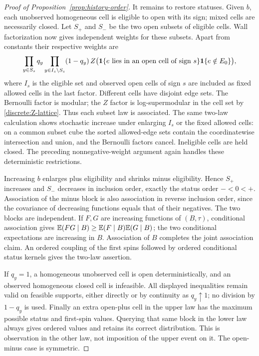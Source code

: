 \begin{proof}[Proof of Proposition~\ref{prop:history-order}]
It remains to restore statuses. Given $b$, each unobserved homogeneous
cell is eligible to open with its sign; mixed cells are necessarily closed.
Let $S_+$ and $S_-$ be the two open subsets of eligible cells. Wall
factorization now gives independent weights for these subsets. Apart from
constants their respective weights are
\begin{equation}\label{discrete:subset-weight}
 \prod_{y\in S_s}q_y
 \prod_{y\in I_s\setminus S_s}(1-q_y)\,
 Z\bigl(\mathbf 1\{e\text{ lies in an open cell of sign }s\}
                    \mathbf 1\{e\notin E_0\}\bigr),
\end{equation}
where $I_s$ is the eligible set and observed open cells of sign $s$ are
included as fixed allowed cells in the last factor. Different cells have
disjoint edge sets. The Bernoulli factor is modular; the $Z$ factor is
log-supermodular in the cell set by \eqref{discrete:Z-lattice}. Thus each
subset law is associated. The same two-law calculation shows stochastic
increase under enlarging $I_s$ or the fixed allowed cells: on a common
subset cube the sorted allowed-edge sets contain the coordinatewise
intersection and union, and the Bernoulli factors cancel. Ineligible cells
are held closed. The preceding nonnegative-weight argument again handles
these deterministic restrictions.

Increasing $b$ enlarges plus eligibility and shrinks minus eligibility.
Hence $S_+$ increases and $S_-$ decreases in inclusion order, exactly the
status order $-<0<+$. Association of the minus block is also association
in reverse inclusion order, since the covariance of decreasing functions
equals that of their negatives. The two blocks are independent. If $F,G$
are increasing functions of $(B,\tau)$, conditional association gives
$\mathbb E(FG\mid B)\ge\mathbb E(F\mid B)\mathbb E(G\mid B)$; the two conditional
expectations are increasing in $B$. Association of $B$ completes the
joint association claim. An ordered coupling of the first spins followed
by ordered conditional status kernels gives the two-law assertion.

If $q_y=1$, a homogeneous unobserved cell is open deterministically, and
an observed homogeneous closed cell is infeasible. All displayed
inequalities remain valid on feasible supports, either directly or by
continuity as $q_y\uparrow1$; no division by $1-q_y$ is used. Finally an
extra open-plus cell in the upper law has the maximum possible status and
first-spin values. Querying that same block in the lower law always gives
ordered values and retains its correct distribution. This is observation
in the other law, not imposition of the upper event on it. The open-minus
case is symmetric.
\end{proof}

